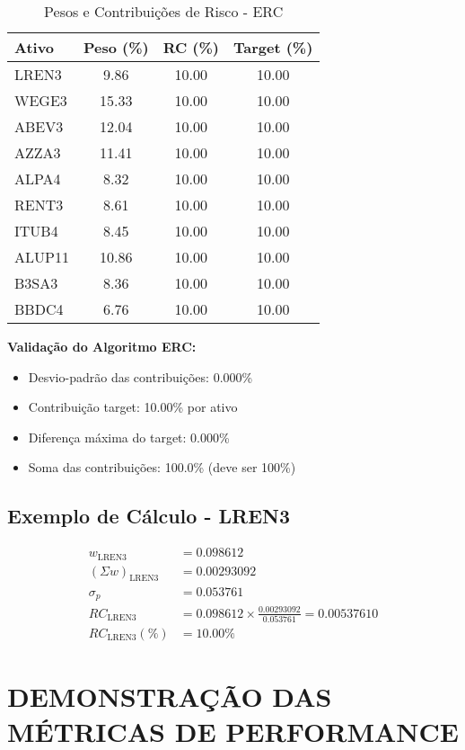 \begin{table}[H]
\centering
\caption{Pesos e Contribuições de Risco - ERC}
\begin{tabular}{|l|c|c|c|}
\hline
\textbf{Ativo} & \textbf{Peso (\%)} & \textbf{RC (\%)} & \textbf{Target (\%)} \\
\hline
LREN3 & 9.86 & 10.00 & 10.00 \\
WEGE3 & 15.33 & 10.00 & 10.00 \\
ABEV3 & 12.04 & 10.00 & 10.00 \\
AZZA3 & 11.41 & 10.00 & 10.00 \\
ALPA4 & 8.32 & 10.00 & 10.00 \\
RENT3 & 8.61 & 10.00 & 10.00 \\
ITUB4 & 8.45 & 10.00 & 10.00 \\
ALUP11 & 10.86 & 10.00 & 10.00 \\
B3SA3 & 8.36 & 10.00 & 10.00 \\
BBDC4 & 6.76 & 10.00 & 10.00 \\
\hline
\end{tabular}
\end{table}

\textbf{Validação do Algoritmo ERC:}
\begin{itemize}
    \item Desvio-padrão das contribuições: 0.000\%
    \item Contribuição target: 10.00\% por ativo
    \item Diferença máxima do target: 0.000\%
    \item Soma das contribuições: 100.0\% (deve ser 100\%)
\end{itemize}

\subsection{Exemplo de Cálculo - LREN3}

\begin{align}
w_{\text{LREN3}} &= 0.098612 \\
(\Sigma w)_{\text{LREN3}} &= 0.00293092 \\
\sigma_p &= 0.053761 \\
RC_{\text{LREN3}} &= 0.098612 \times \frac{0.00293092}{0.053761} = 0.00537610 \\
RC_{\text{LREN3}} (\%) &= 10.00\%
\end{align}

\section{DEMONSTRAÇÃO DAS MÉTRICAS DE PERFORMANCE}

